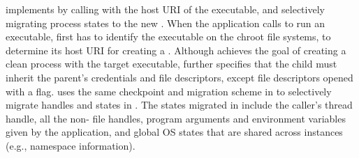 \thelibos{} implements  by calling  with
the host URI of the executable,
and selectively migrating process states to the new \picoproc{}.
When the application calls  to run an executable, \thelibos{} first has to identify the executable on the chroot file systems,
to determine its host URI for creating a \picoproc{}.
Although  achieves the goal of creating a clean process with the target executable,
 further specifies that the child must inherit the parent's credentials and file descriptors, except file descriptors opened with a  flag.
\thelibos{} uses the same checkpoint and migration scheme in  to selectively migrate handles and \libos{} states in .
The states migrated in 
include the caller's thread handle, all the non- file handles, program arguments and environment variables given by the application, and global OS states that are shared across \thelibos{} instances
(e.g., namespace information).



